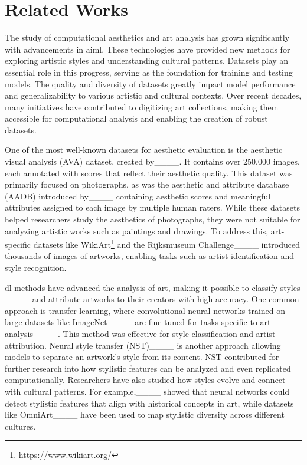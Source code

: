 \section{Related Works}
The study of computational aesthetics and art analysis has grown significantly with advancements in \gls{ai}\gls{ml}. These technologies have provided new methods for exploring artistic styles and understanding cultural patterns. Datasets play an essential role in this progress, serving as the foundation for training and testing models. The quality and diversity of datasets greatly impact model performance and generalizability to various artistic and cultural contexts. Over recent decades, many initiatives have contributed to digitizing art collections, making them accessible for computational analysis and enabling the creation of robust datasets.

One of the most well-known datasets for aesthetic evaluation is the aesthetic visual analysis (AVA) dataset, created by____. It contains over 250,000 images, each annotated with scores that reflect their aesthetic quality. This dataset was primarily focused on photographs, as was the aesthetic and attribute database (AADB) introduced by____ containing aesthetic scores and meaningful attributes assigned to each image by multiple human raters.
 While these datasets helped researchers study the aesthetics of photographs, they were not suitable for analyzing artistic works such as paintings and drawings. To address this, art-specific datasets like WikiArt\footnote{\url{https://www.wikiart.org/}} and the Rijksmuseum Challenge____ introduced thousands of images of artworks, enabling tasks such as artist identification and style recognition. %

\gls{dl} methods have advanced the analysis of art, making it possible to classify styles ____ and attribute artworks to their creators with high accuracy. One common approach is transfer learning, where convolutional neural networks trained on large datasets like ImageNet____ are fine-tuned for tasks specific to art analysis____. This method was effective for style classification and artist attribution. Neural style transfer (NST)____ is another approach allowing models to separate an artwork's style from its content. NST contributed for further research into how stylistic features can be analyzed and even replicated computationally. Researchers have also studied how styles evolve and connect with cultural patterns. For example,____ showed that neural networks could detect stylistic features that align with historical concepts in art, while datasets like OmniArt____ have been used to map stylistic diversity across different cultures. 

